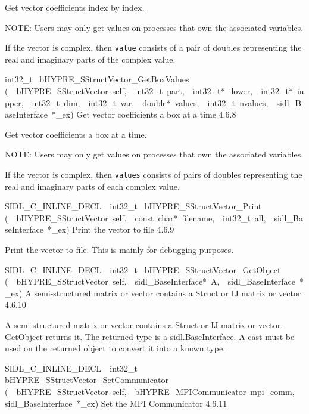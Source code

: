 \documentclass{article}
\begin{document}
\begin{cxxentry}
\begin{cxxentry}
\begin{cxxfunction}
\begin{cxxdoc}
Get vector coefficients index by index.

NOTE: Users may only get values on processes that own the
associated variables.

If the vector is complex, then {\tt value} consists of a pair
of doubles representing the real and imaginary parts of the
complex value.
\end{cxxdoc}
\end{cxxfunction}
\begin{cxxfunction}
{int32\_t\ }
        {bHYPRE\_SStructVector\_GetBoxValues}
        {(\ \ bHYPRE\_SStructVector\ self,\ \ int32\_t\ part,\ \ int32\_t*\ ilower,\ \ int32\_t*\ iupper,\ \ int32\_t\ dim,\ \ int32\_t\ var,\ \ double*\ values,\ \ int32\_t\ nvalues,\ \ sidl\_BaseInterface\ *\_ex)}
        {
Get vector coefficients a box at a time}
        {4.6.8}
\begin{cxxdoc}

Get vector coefficients a box at a time.

NOTE: Users may only get values on processes that own the
associated variables.

If the vector is complex, then {\tt values} consists of pairs
of doubles representing the real and imaginary parts of each
complex value.
\end{cxxdoc}
\end{cxxfunction}
\begin{cxxfunction}
{SIDL\_C\_INLINE\_DECL\ \ int32\_t\ }
        {bHYPRE\_SStructVector\_Print}
        {(\ \ bHYPRE\_SStructVector\ self,\ \ const\ char*\ filename,\ \ int32\_t\ all,\ \ sidl\_BaseInterface\ *\_ex)}
        {
Print the vector to file}
        {4.6.9}
\begin{cxxdoc}

Print the vector to file.  This is mainly for debugging
purposes.
\end{cxxdoc}
\end{cxxfunction}
\begin{cxxfunction}
{SIDL\_C\_INLINE\_DECL\ \ int32\_t\ }
        {bHYPRE\_SStructVector\_GetObject}
        {(\ \ bHYPRE\_SStructVector\ self,\ \ sidl\_BaseInterface*\ A,\ \ sidl\_BaseInterface\ *\_ex)}
        {
A semi-structured matrix or vector contains a Struct or IJ matrix
or vector}
        {4.6.10}
\begin{cxxdoc}

A semi-structured matrix or vector contains a Struct or IJ matrix
or vector.  GetObject returns it.
The returned type is a sidl.BaseInterface.
A cast must be used on the returned object to convert it into a known type.
\end{cxxdoc}
\end{cxxfunction}
\begin{cxxfunction}
{SIDL\_C\_INLINE\_DECL\ \ int32\_t\ }
        {bHYPRE\_SStructVector\_SetCommunicator}
        {(\ \ bHYPRE\_SStructVector\ self,\ \ bHYPRE\_MPICommunicator\ mpi\_comm,\ \ sidl\_BaseInterface\ *\_ex)}
        {
Set the MPI Communicator}
        {4.6.11}
\begin{cxxdoc}


\end{cxxdoc}
\end{cxxfunction}
\end{cxxentry}
\end{cxxentry}
\end{document}
